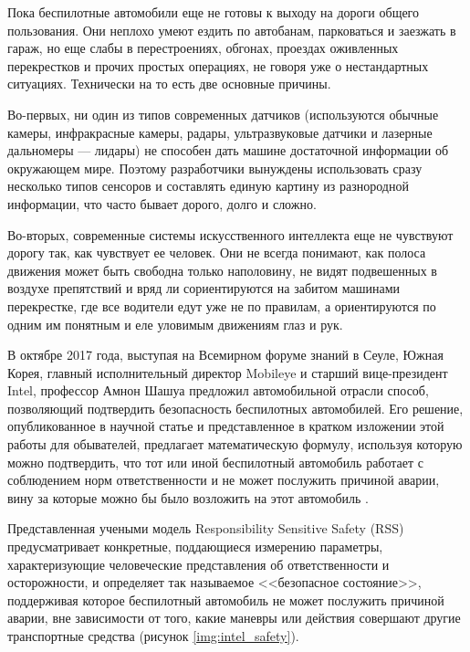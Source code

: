 Пока беспилотные автомобили еще не готовы к выходу на дороги общего пользования. Они 
неплохо умеют ездить по автобанам, парковаться и заезжать в гараж, но еще слабы 
в перестроениях, обгонах, проездах оживленных перекрестков и прочих простых 
операциях, не говоря уже о нестандартных ситуациях. Технически на то есть две 
основные причины.

Во-первых, ни один из типов современных датчиков (используются 
обычные камеры, инфракрасные камеры, радары, ультразвуковые датчики и лазерные 
дальномеры — лидары) не способен дать машине достаточной информации об 
окружающем мире. Поэтому разработчики вынуждены использовать сразу несколько 
типов сенсоров и составлять единую картину из разнородной информации, что часто 
бывает дорого, долго и сложно.

Во-вторых, современные системы искусственного интеллекта еще не чувствуют 
дорогу так, как чувствует ее человек. Они не всегда понимают, как полоса 
движения может быть свободна только наполовину, не видят подвешенных в воздухе 
препятствий и вряд ли сориентируются на забитом машинами перекрестке, где все 
водители едут уже не по правилам, а ориентируются по одним им понятным и еле 
уловимым движениям глаз и рук.


В октябре 2017 года, выступая на Всемирном форуме знаний в Сеуле, Южная Корея, 
главный исполнительный директор Mobileye и старший вице-президент Intel, 
профессор Амнон Шашуа предложил автомобильной отрасли способ, 
позволяющий подтвердить безопасность беспилотных автомобилей. Его решение, 
опубликованное в научной статье и представленное в кратком изложении этой 
работы для обывателей, предлагает математическую формулу, используя которую 
можно подтвердить, что тот или иной беспилотный автомобиль работает с 
соблюдением норм ответственности и не может послужить причиной аварии, вину за 
которые можно бы было возложить на этот автомобиль \cite{Intel_Safety}.

Представленная учеными модель Responsibility Sensitive Safety (RSS) предусматривает 
конкретные, поддающиеся измерению параметры, характеризующие человеческие 
представления об ответственности и осторожности, и определяет так называемое 
<<безопасное состояние>>, поддерживая которое беспилотный автомобиль 
не может послужить причиной аварии, вне зависимости от того, какие маневры или 
действия совершают другие транспортные средства (рисунок \ref{img:intel_safety}).

